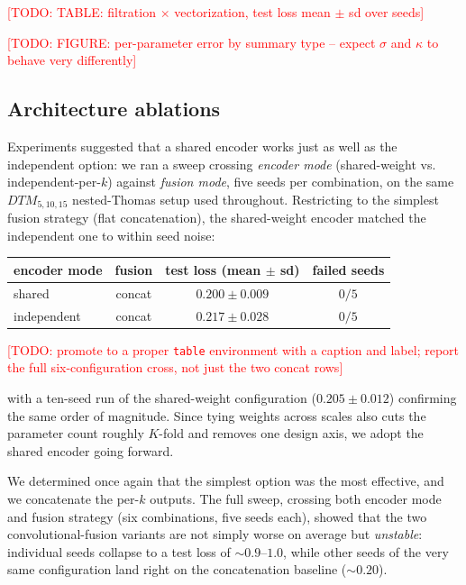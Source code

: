 \documentclass[11pt,letterpaper]{article}
\newcommand{\1}{\mathds{1}}
\newcommand{\todo}[1]{\textcolor{red}{[TODO: #1]}}
\newcommand{\todo}[1]{}
\theoremstyle{plain}
\theoremstyle{definitioncolon}
\begin{document}
\todo{TABLE: filtration $\times$ vectorization, test loss mean $\pm$ sd over
seeds}

\todo{FIGURE: per-parameter error by summary type -- expect $\sigma$ and
$\kappa$ to behave very differently}

\subsection{Architecture ablations}
\label{ssec:exp-ablations}
Experiments suggested that a shared encoder works just as well as the independent
option: we ran a sweep crossing \emph{encoder mode} (shared-weight vs.
independent-per-$k$) against \emph{fusion mode}, five seeds per combination, on
the same $DTM_{5,10,15}$ nested-Thomas setup used throughout. Restricting to the
simplest fusion strategy (flat concatenation), the shared-weight encoder matched
the independent one to within seed noise:

\begin{center}
\begin{tabular}{lccc}
\toprule
encoder mode & fusion & test loss (mean $\pm$ sd) & failed seeds \\
\midrule
shared      & concat & $0.200 \pm 0.009$ & $0/5$ \\
independent & concat & $0.217 \pm 0.028$ & $0/5$ \\
\bottomrule
\end{tabular}
\end{center}
\todo{promote to a proper \texttt{table} environment with a caption and label;
report the full six-configuration cross, not just the two concat rows}

with a ten-seed run of the shared-weight configuration ($0.205 \pm 0.012$)
confirming the same order of magnitude. Since tying weights across scales also
cuts the parameter count roughly $K$-fold and removes one design axis, we adopt
the shared encoder going forward.

We determined once again that the simplest option was the most effective, and we
concatenate the per-$k$ outputs. The full sweep, crossing both encoder mode and
fusion strategy (six combinations, five seeds each), showed that the two
convolutional-fusion variants are not simply worse on average but
\emph{unstable}: individual seeds collapse to a test loss of $\sim\!0.9$--$1.0$,
while other seeds of the very same configuration land right on the concatenation
baseline ($\sim\!0.20$).
\end{document}
